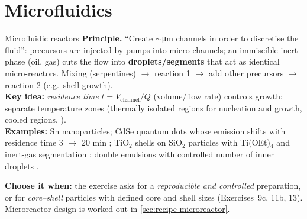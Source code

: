 \section{Microfluidics}
\begin{cardbox}{Microfluidic reactors }
\textbf{Principle.} ``Create $\sim$\si{\micro m} channels in order to discretise the fluid'': precursors are injected
by pumps into micro-channels; an immiscible inert phase (oil, gas) cuts the flow into \textbf{droplets/segments}
that act as identical micro-reactors. Mixing (serpentines) $\to$ reaction 1 $\to$ add other precursors $\to$ reaction 2
(e.g.\ shell growth).\\
\textbf{Key idea:} \emph{residence time} $t = V_\text{channel}/Q$ (volume/flow rate) controls growth; separate
temperature zones (thermally isolated regions for nucleation and growth, cooled regions, ).\\
\textbf{Examples:} Sn nanoparticles; CdSe quantum dots whose emission shifts with residence time 3 $\to$ 20 min
; TiO$_2$ shells on SiO$_2$ particles with Ti(OEt)$_4$ and inert-gas segmentation ;
double emulsions with controlled number of inner droplets .
\end{cardbox}
\textbf{Choose it when:} the exercise asks for a \emph{reproducible and controlled} preparation, or for
\emph{core--shell} particles with defined core and shell sizes (Exercises~9c, 11b, 13). Microreactor design is worked out
in \cref{sec:recipe-microreactor}.
